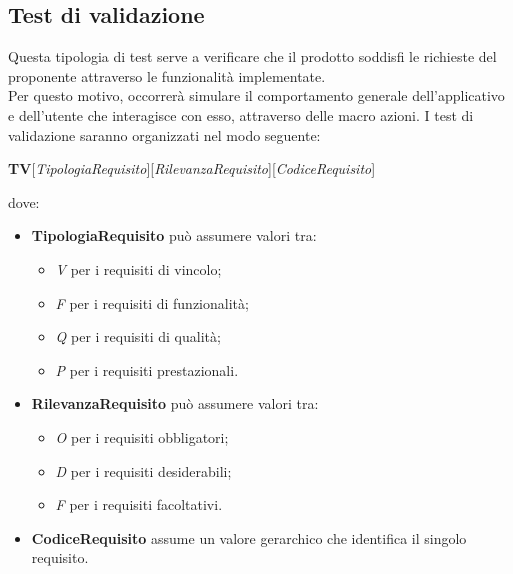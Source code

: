 	\subsection{Test di validazione}
	Questa tipologia di test serve a verificare che il prodotto soddisfi le richieste del proponente attraverso le funzionalità implementate.\\
	Per questo motivo, occorrerà simulare il comportamento generale dell'applicativo e dell'utente che interagisce con esso, attraverso delle macro azioni.
	I test di validazione saranno organizzati nel modo seguente:
	\begin{center}
		\textbf{TV}[\textit{TipologiaRequisito}][\textit{RilevanzaRequisito}][\textit{CodiceRequisito}]
	\end{center}
	dove:
	\begin{itemize}
		\item
		\textbf{TipologiaRequisito} può assumere valori tra:
		\begin{itemize}
			\item
			\textit{V} per i requisiti di vincolo;
			\item
			\textit{F} per i requisiti di funzionalità;
			\item
			\textit{Q} per i requisiti di qualità;
			\item
			\textit{P} per i requisiti prestazionali.
		\end{itemize}
		\item 
		\textbf{RilevanzaRequisito} può assumere valori tra:
		\begin{itemize}
			\item
			\textit{O} per i requisiti obbligatori;
			\item
			\textit{D} per i requisiti desiderabili;
			\item
			\textit{F} per i requisiti facoltativi.
		\end{itemize}
		\item
		\textbf{CodiceRequisito} assume un valore gerarchico che identifica il singolo requisito.
	\end{itemize}

